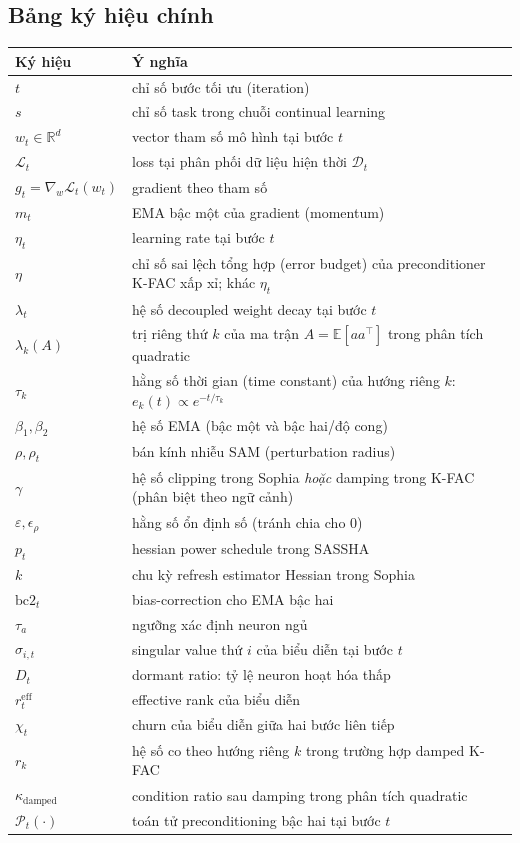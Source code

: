 \documentclass[11pt]{article}
\newcommand{\R}{\mathbb{R}}
\newcommand{\E}{\mathbb{E}}
\begin{document}
\subsection{Bảng ký hiệu chính}
\begin{center}
\begin{tabular}{ll}
\toprule
Ký hiệu & Ý nghĩa \\
\midrule
$t$ & chỉ số bước tối ưu (iteration) \\
$s$ & chỉ số task trong chuỗi continual learning \\
$w_t \in \R^d$ & vector tham số mô hình tại bước $t$ \\
$\mathcal{L}_t$ & loss tại phân phối dữ liệu hiện thời $\mathcal{D}_t$ \\
$g_t=\nabla_w \mathcal{L}_t(w_t)$ & gradient theo tham số \\
$m_t$ & EMA bậc một của gradient (momentum) \\
$\eta_t$ & learning rate tại bước $t$ \\
$\eta$ & chỉ số sai lệch tổng hợp (error budget) của preconditioner K-FAC xấp xỉ; khác $\eta_t$ \\
$\lambda_t$ & hệ số decoupled weight decay tại bước $t$ \\
$\lambda_k(A)$ & trị riêng thứ $k$ của ma trận $A=\E[aa^\top]$ trong phân tích quadratic \\
$\tau_k$ & hằng số thời gian (time constant) của hướng riêng $k$: $e_k(t)\propto e^{-t/\tau_k}$ \\
$\beta_1,\beta_2$ & hệ số EMA (bậc một và bậc hai/độ cong) \\
$\rho,\rho_t$ & bán kính nhiễu SAM (perturbation radius) \\
$\gamma$ & hệ số clipping trong Sophia \emph{hoặc} damping trong K-FAC (phân biệt theo ngữ cảnh) \\
$\varepsilon,\epsilon_\rho$ & hằng số ổn định số (tránh chia cho 0) \\
$p_t$ & hessian power schedule trong SASSHA \\
$k$ & chu kỳ refresh estimator Hessian trong Sophia \\
$\mathrm{bc2}_t$ & bias-correction cho EMA bậc hai \\
$\tau_a$ & ngưỡng xác định neuron ngủ \\
$\sigma_{i,t}$ & singular value thứ $i$ của biểu diễn tại bước $t$ \\
$D_t$ & dormant ratio: tỷ lệ neuron hoạt hóa thấp \\
$r_t^{\mathrm{eff}}$ & effective rank của biểu diễn \\
$\chi_t$ & churn của biểu diễn giữa hai bước liên tiếp \\
$r_k$ & hệ số co theo hướng riêng $k$ trong trường hợp damped K-FAC \\
$\kappa_{\mathrm{damped}}$ & condition ratio sau damping trong phân tích quadratic \\
$\mathcal{P}_t(\cdot)$ & toán tử preconditioning bậc hai tại bước $t$ \\
\bottomrule
\end{tabular}
\end{center}
\end{document}

